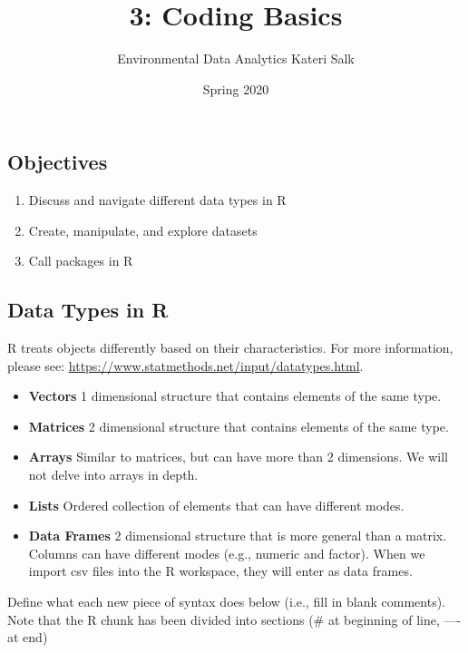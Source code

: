 \documentclass[
]{article}
\title{3: Coding Basics}
\author{Environmental Data Analytics \textbar{} Kateri Salk}
\date{Spring 2020}
\providecommand{\tightlist}{%
  \setlength{\itemsep}{0pt}\setlength{\parskip}{0pt}}
\begin{document}
\maketitle

\hypertarget{objectives}{%
\subsection{Objectives}\label{objectives}}

\begin{enumerate}
\def\labelenumi{\arabic{enumi}.}
\tightlist
\item
  Discuss and navigate different data types in R
\item
  Create, manipulate, and explore datasets
\item
  Call packages in R
\end{enumerate}

\hypertarget{data-types-in-r}{%
\subsection{Data Types in R}\label{data-types-in-r}}

R treats objects differently based on their characteristics. For more
information, please see:
\url{https://www.statmethods.net/input/datatypes.html}.

\begin{itemize}
\item
  \textbf{Vectors} 1 dimensional structure that contains elements of the
  same type.
\item
  \textbf{Matrices} 2 dimensional structure that contains elements of
  the same type.
\item
  \textbf{Arrays} Similar to matrices, but can have more than 2
  dimensions. We will not delve into arrays in depth.
\item
  \textbf{Lists} Ordered collection of elements that can have different
  modes.
\item
  \textbf{Data Frames} 2 dimensional structure that is more general than
  a matrix. Columns can have different modes (e.g., numeric and factor).
  When we import csv files into the R workspace, they will enter as data
  frames.
\end{itemize}

Define what each new piece of syntax does below (i.e., fill in blank
comments). Note that the R chunk has been divided into sections (\# at
beginning of line, ---- at end)
\end{document}
